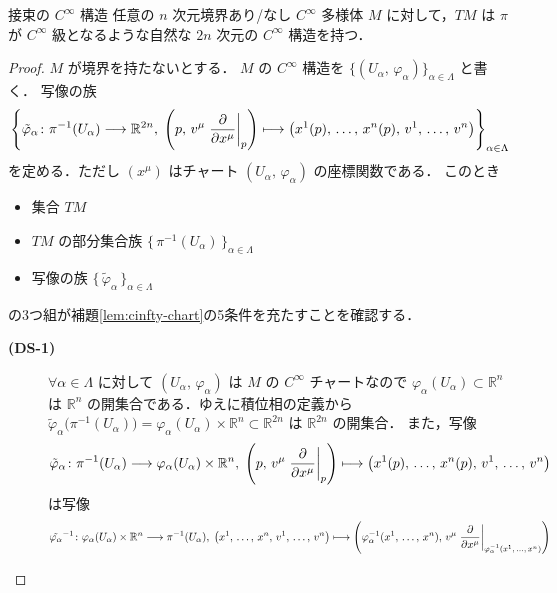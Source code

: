 \documentclass[TQFT_main]{subfiles}
\begin{document}
\begin{myprop}[label=prop:tangentbundle]{接束の $C^\infty$ 構造}
    任意の $n$ 次元境界あり/なし $C^\infty$ 多様体 $M$ に対して，$TM$ は $\pi$ が $C^\infty$ 級となるような自然な $2n$ 次元の $C^\infty$ 構造を持つ．
\end{myprop}

\begin{proof}
    $M$ が境界を持たないとする．
    $M$ の $C^\infty$ 構造を $\{(U_\alpha,\, \varphi_\alpha)\}_{\alpha \in \Lambda}$ と書く．
    写像の族
    \begin{align}
        \left\{\tilde{\varphi}_\alpha \colon \pi^{-1} (U_\alpha) \lto \mathbb{R}^{2n},\; \left(p,\, v^\mu \eval{\pdv{}{x^\mu}}_p \right) \lmto \bigl( x^1 (p),\, \dots,\, x^n(p),\, v^1,\, \dots,\, v^n \bigr) \right\}_{\alpha \in \Lambda}
    \end{align}
    を定める．ただし $(x^\mu)$ はチャート $(U_\alpha,\, \varphi_\alpha)$ の座標関数である．
    このとき
    \begin{itemize}
        \item 集合 $TM$
        \item $TM$ の部分集合族 $\bigl\{\, \pi^{-1}(U_\alpha) \,\bigr\}_{\alpha \in \Lambda}$
        \item 写像の族 $\bigl\{\, \tilde{\varphi}_\alpha \,\bigr\}_{\alpha \in \Lambda}$
    \end{itemize}
    の3つ組が補題\ref{lem:cinfty-chart}の5条件を充たすことを確認する．
    \begin{description}
        \item[\textbf{(DS-1)}] $\forall \alpha \in \Lambda$ に対して $(U_\alpha,\, \varphi_\alpha)$ は $M$ の $C^\infty$ チャートなので $\varphi_\alpha(U_\alpha) \subset \mathbb{R}^n$ は $\mathbb{R}^n$ の開集合である．ゆえに積位相の定義から $\tilde{\varphi}_\alpha \bigl( \pi^{-1} (U_\alpha) \bigr) = \varphi_\alpha (U_\alpha) \times \mathbb{R}^n \subset \mathbb{R}^{2n}$ は $\mathbb{R}^{2n}$ の開集合．
        また，写像
        \begin{align}
            \tilde{\varphi}_\alpha \colon \pi^{-1} (U_\alpha) \lto \varphi_\alpha (U_\alpha) \times \mathbb{R}^n,\; \left(p,\, v^\mu \eval{\pdv{}{x^\mu}}_p \right) \lmto \bigl( x^1 (p),\, \dots,\, x^n(p),\, v^1,\, \dots,\, v^n \bigr) 
        \end{align}
        は写像
        \begin{align}
            \tilde{\varphi_\alpha}^{-1} \colon \varphi_\alpha(U_\alpha) \times \mathbb{R}^n \lto \pi^{-1} (U_\alpha),\; \bigl( x^1,\, \dots,\, x^n,\, v^1,\, \dots,\, v^n \bigr) \lmto \left(\varphi_\alpha^{-1}(x^1,\, \dots,\, x^n),\, v^\mu \eval{\pdv{}{x^\mu}}_{\varphi_\alpha^{-1}(x^1,\, \dots,\, x^n)} \right)

\end{align}
\end{description}
\end{proof}
\end{document}
